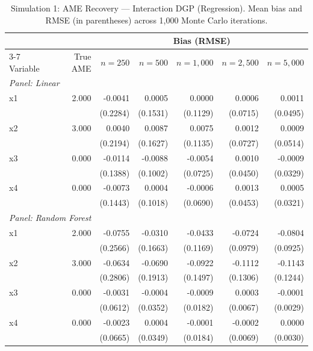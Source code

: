 \documentclass[12pt]{article}
\begin{document}
	\begin{table}[htbp]
		\centering
		\small
		\begin{threeparttable}
			\caption{Simulation 1: AME Recovery --- Interaction DGP (Regression). Mean bias and RMSE (in parentheses) across 1,000 Monte Carlo iterations.}
			\label{tab:sim1_regression_interaction}
			\begin{tabular}{lrrrrrr}
				\toprule
				& & \multicolumn{5}{c}{Bias (RMSE)} \\
				\cmidrule(lr){3-7}
				Variable & True AME & $n=250$ & $n=500$ & $n=1,000$ & $n=2,500$ & $n=5,000$ \\
				\midrule
				\multicolumn{7}{l}{\textit{Panel: Linear}} \\
				\quad x1 & 2.000 & -0.0041 & 0.0005 & 0.0000 & 0.0006 & 0.0011 \\
				&  & (0.2284) & (0.1531) & (0.1129) & (0.0715) & (0.0495) \\
				\quad x2 & 3.000 & 0.0040 & 0.0087 & 0.0075 & 0.0012 & 0.0009 \\
				&  & (0.2194) & (0.1627) & (0.1135) & (0.0727) & (0.0514) \\
				\quad x3 & 0.000 & -0.0114 & -0.0088 & -0.0054 & 0.0010 & -0.0009 \\
				&  & (0.1388) & (0.1002) & (0.0725) & (0.0450) & (0.0329) \\
				\quad x4 & 0.000 & -0.0073 & 0.0004 & -0.0006 & 0.0013 & 0.0005 \\
				&  & (0.1443) & (0.1018) & (0.0690) & (0.0453) & (0.0321) \\
				\midrule
				\multicolumn{7}{l}{\textit{Panel: Random Forest}} \\
				\quad x1 & 2.000 & -0.0755 & -0.0310 & -0.0433 & -0.0724 & -0.0804 \\
				&  & (0.2566) & (0.1663) & (0.1169) & (0.0979) & (0.0925) \\
				\quad x2 & 3.000 & -0.0634 & -0.0690 & -0.0922 & -0.1112 & -0.1143 \\
				&  & (0.2806) & (0.1913) & (0.1497) & (0.1306) & (0.1244) \\
				\quad x3 & 0.000 & -0.0031 & -0.0004 & -0.0009 & 0.0003 & -0.0001 \\
				&  & (0.0612) & (0.0352) & (0.0182) & (0.0067) & (0.0029) \\
				\quad x4 & 0.000 & -0.0023 & 0.0004 & -0.0001 & -0.0002 & 0.0000 \\
				&  & (0.0665) & (0.0349) & (0.0184) & (0.0069) & (0.0030) \\
				\midrule

\end{tabular}
\end{threeparttable}
\end{table}
\end{document}
